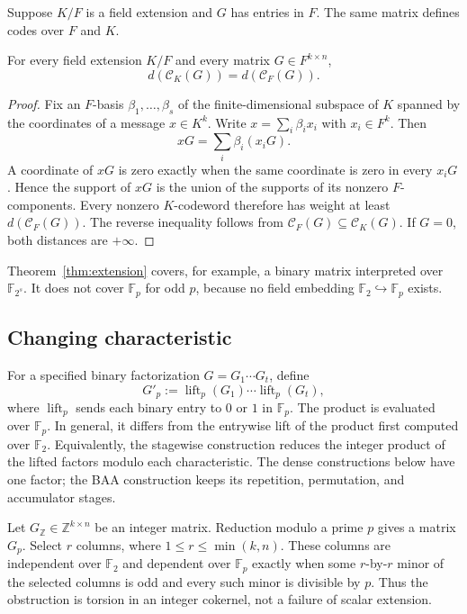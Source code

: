 \documentclass[runningheads,envcountsame,envcountsect]{llncs}
\newcommand{\F}{\mathbb F}
\newcommand{\cC}{\mathcal C}
\begin{document}
Suppose $K/F$ is a field extension and $G$ has entries in $F$.  The same
matrix defines codes over $F$ and $K$.

\begin{theorem}\label{thm:extension}
For every field extension $K/F$ and every matrix $G\in F^{k\times n}$,
\[
  d(\cC_K(G))=d(\cC_F(G)).
\]
\end{theorem}

\begin{proof}
Fix an $F$-basis $\beta_1,\ldots,\beta_s$ of the finite-dimensional subspace
of $K$ spanned by the coordinates of a message $x\in K^k$.  Write
$x=\sum_i\beta_i x_i$ with $x_i\in F^k$.  Then
\[
  xG=\sum_i\beta_i(x_iG).
\]
A coordinate of $xG$ is zero exactly when the same coordinate is zero in every
$x_iG$.  Hence the support of $xG$ is the union of the supports of its nonzero
$F$-components.  Every nonzero $K$-codeword therefore has weight at least
$d(\cC_F(G))$. The reverse inequality follows from
$\cC_F(G)\subseteq\cC_K(G)$. If $G=0$, both distances are $+\infty$.
\end{proof}

Theorem~\ref{thm:extension} covers, for example, a binary matrix interpreted
over $\F_{2^s}$.  It does not cover $\F_p$ for odd $p$, because no field
embedding $\F_2\hookrightarrow\F_p$ exists.

\subsection{Changing characteristic}

For a specified binary factorization $G=G_1\cdots G_t$, define
\[
  G'_p:=\operatorname{lift}_p(G_1)\cdots\operatorname{lift}_p(G_t),
\]
where $\operatorname{lift}_p$ sends each binary entry to $0$ or $1$ in
$\F_p$.  The product is evaluated over $\F_p$.  In general, it differs from
the entrywise lift of the product first computed over $\F_2$.  Equivalently,
the stagewise construction reduces the integer product of the lifted factors
modulo each characteristic.  The dense constructions below have one factor;
the BAA construction keeps its repetition, permutation, and accumulator stages.

Let $G_{\mathbb Z}\in\mathbb Z^{k\times n}$ be an integer matrix.  Reduction
modulo a prime $p$ gives a matrix $G_p$. Select $r$ columns, where
$1\le r\le\min(k,n)$. These columns are independent over $\F_2$ and
dependent over $\F_p$ exactly when some $r$-by-$r$ minor of the selected
columns is odd and every such minor is divisible by $p$. Thus the
obstruction is torsion in an integer
cokernel, not a failure of scalar extension.
\end{document}

